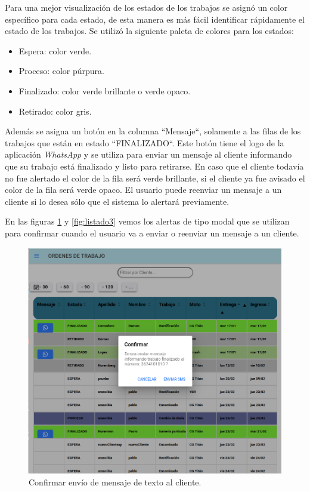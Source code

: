 Para una mejor visualización de los estados de los trabajos se asignó un color específico para cada estado, de esta manera es más fácil identificar rápidamente el estado de los trabajos. Se utilizó la siguiente paleta de colores para los estados:

\begin{itemize}
\item Espera: color verde.
\item Proceso: color púrpura.
\item Finalizado: color verde brillante o verde opaco.
\item Retirado: color gris. 
\end{itemize} 

Además se asigna un botón en la columna ``Mensaje``, solamente a las filas de los trabajos que están en estado ``FINALIZADO``. Este botón tiene el logo de la aplicación \textit{WhatsApp} y se utiliza para enviar un mensaje al cliente informando que su trabajo está finalizado y listo para retirarse. En caso que el cliente todavía no fue alertado el color de la fila será verde brillante, si el cliente ya fue avisado el color de la fila será verde opaco. El usuario puede reenviar un mensaje a un cliente si lo desea sólo que el sistema lo alertará previamente.

En las figuras \ref{fig:listado2} y \ref{fig:listado3} vemos los alertas de tipo modal que se utilizan para confirmar cuando el usuario va a enviar o reenviar un mensaje a un cliente.

\begin{figure}[H]
	\centering
	\includegraphics[scale=.30]{./Figures/listado-2.png}
	\caption{Confirmar envío de mensaje de texto al cliente.}
	\label{fig:listado2}
\end{figure}

